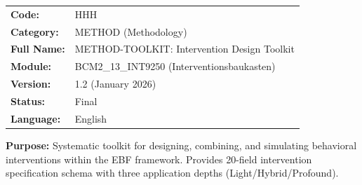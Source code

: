 %
%


\begin{tcolorbox}[colback=gray!5!white, colframe=gray!75!black,
    title=Appendix Header: HHH METHOD-TOOLKIT]

\begin{tabular}{@{}ll@{}}
\textbf{Code:} & HHH \\
\textbf{Category:} & METHOD (Methodology) \\
\textbf{Full Name:} & METHOD-TOOLKIT: Intervention Design Toolkit \\
\textbf{Module:} & BCM2\_13\_INT9250 (Interventionsbaukasten) \\
\textbf{Version:} & 1.2 (January 2026) \\
\textbf{Status:} & Final \\
\textbf{Language:} & English \\
\end{tabular}

\vspace{0.5em}
\textbf{Purpose:} Systematic toolkit for designing, combining, and simulating
behavioral interventions within the EBF framework. Provides 20-field intervention
specification schema with three application depths (Light/Hybrid/Profound).

\end{tcolorbox}


